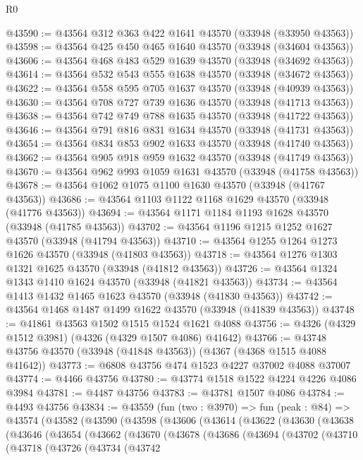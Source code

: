 \begin{lexlean}{R0}
\begin{coremodule}
@43590 := @43564 @312 @363 @422 @1641 @43570 (@33948 (@33950 @43563))
@43598 := @43564 @425 @450 @465 @1640 @43570 (@33948 (@34604 @43563))
@43606 := @43564 @468 @483 @529 @1639 @43570 (@33948 (@34692 @43563))
@43614 := @43564 @532 @543 @555 @1638 @43570 (@33948 (@34672 @43563))
@43622 := @43564 @558 @595 @705 @1637 @43570 (@33948 (@40939 @43563))
@43630 := @43564 @708 @727 @739 @1636 @43570 (@33948 (@41713 @43563))
@43638 := @43564 @742 @749 @788 @1635 @43570 (@33948 (@41722 @43563))
@43646 := @43564 @791 @816 @831 @1634 @43570 (@33948 (@41731 @43563))
@43654 := @43564 @834 @853 @902 @1633 @43570 (@33948 (@41740 @43563))
@43662 := @43564 @905 @918 @959 @1632 @43570 (@33948 (@41749 @43563))
@43670 := @43564 @962 @993 @1059 @1631 @43570 (@33948 (@41758 @43563))
@43678 := @43564 @1062 @1075 @1100 @1630 @43570 (@33948 (@41767 @43563))
@43686 := @43564 @1103 @1122 @1168 @1629 @43570 (@33948 (@41776 @43563))
@43694 := @43564 @1171 @1184 @1193 @1628 @43570 (@33948 (@41785 @43563))
@43702 := @43564 @1196 @1215 @1252 @1627 @43570 (@33948 (@41794 @43563))
@43710 := @43564 @1255 @1264 @1273 @1626 @43570 (@33948 (@41803 @43563))
@43718 := @43564 @1276 @1303 @1321 @1625 @43570 (@33948 (@41812 @43563))
@43726 := @43564 @1324 @1343 @1410 @1624 @43570 (@33948 (@41821 @43563))
@43734 := @43564 @1413 @1432 @1465 @1623 @43570 (@33948 (@41830 @43563))
@43742 := @43564 @1468 @1487 @1499 @1622 @43570 (@33948 (@41839 @43563))
@43748 := @41861 @43563 @1502 @1515 @1524 @1621 @4088
@43756 := @4326 (@4329 @1512 @3981) (@4326 (@4329 @1507 @4086) @41642)
@43766 := @43748 @43756 @43570 (@33948 (@41848 @43563)) (@4367 (@4368 @1515 @4088 @41642))
@43773 := @6808 @43756 @474 @1523 @4227 @37002 @4088 @37007
@43774 := @4466 @43756
@43780 := @43774 @1518 @1522 @4224 @4226 @4086 @3984
@43781 := @4487 @43756
@43783 := @43781 @1507 @4086
@43784 := @4493 @43756
@43834 := @43559
    (fun (two : @3970) =>
    fun (peak : @84) =>
    @43574
      (@43582
        (@43590
          (@43598
            (@43606
              (@43614
                (@43622
                  (@43630
                    (@43638
                      (@43646
                        (@43654
                          (@43662
                            (@43670
                              (@43678
                                (@43686
                                  (@43694
                                    (@43702
                                      (@43710
                                        (@43718
                                          (@43726
                                            (@43734
                                              (@43742

\end{coremodule}
\end{lexlean}
